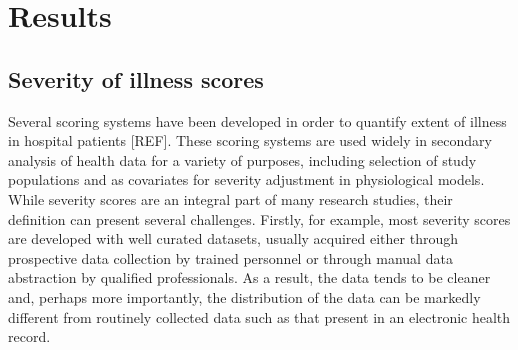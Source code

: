 \documentclass{elsart}
\begin{document}







\section{Results}

\subsection{Severity of illness scores}


Several scoring systems have been developed in order to quantify extent of illness in hospital patients [REF]. These scoring systems are used widely in secondary analysis of health data for a variety of purposes, including selection of study populations and as covariates for severity adjustment in physiological models. While severity scores are an integral part of many research studies, their definition can present several challenges. Firstly, for example, most severity scores are developed with well curated datasets, usually acquired either through prospective data collection by trained personnel or through manual data abstraction by qualified professionals. As a result, the data tends to be cleaner and, perhaps more importantly, the distribution of the data can be markedly different from routinely collected data such as that present in an electronic health record. 
\end{document}
